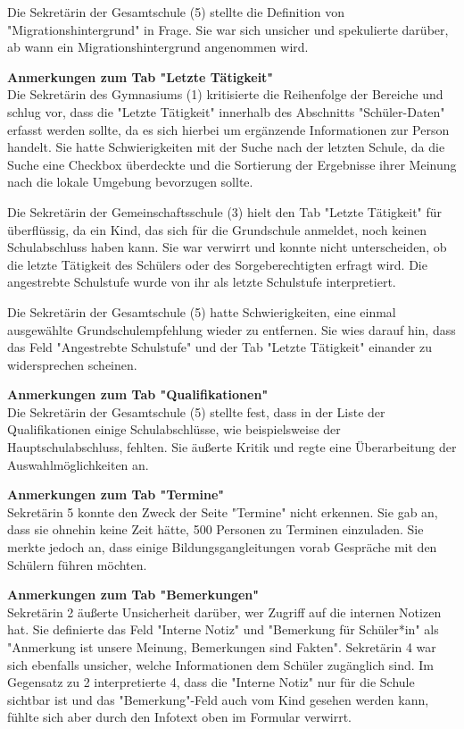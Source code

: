 Die Sekretärin der Gesamtschule (5) stellte die Definition von "Migrationshintergrund" in Frage. Sie war sich unsicher und spekulierte darüber, ab wann ein Migrationshintergrund angenommen wird.

\textbf{Anmerkungen zum Tab "Letzte Tätigkeit"}\\
Die Sekretärin des Gymnasiums (1) kritisierte die Reihenfolge der Bereiche und schlug vor, dass die "Letzte Tätigkeit" innerhalb des Abschnitts "Schüler-Daten" erfasst werden sollte, da es sich hierbei um ergänzende Informationen zur Person handelt. Sie hatte Schwierigkeiten mit der Suche nach der letzten Schule, da die Suche eine Checkbox überdeckte und die Sortierung der Ergebnisse ihrer Meinung nach die lokale Umgebung bevorzugen sollte.

Die Sekretärin der Gemeinschaftsschule (3) hielt den Tab "Letzte Tätigkeit" für überflüssig, da ein Kind, das sich für die Grundschule anmeldet, noch keinen Schulabschluss haben kann. Sie war verwirrt und konnte nicht unterscheiden, ob die letzte Tätigkeit des Schülers oder des Sorgeberechtigten erfragt wird. Die angestrebte Schulstufe wurde von ihr als letzte Schulstufe interpretiert.

Die Sekretärin der Gesamtschule (5) hatte Schwierigkeiten, eine einmal ausgewählte Grundschulempfehlung wieder zu entfernen. Sie wies darauf hin, dass das Feld "Angestrebte Schulstufe" und der Tab "Letzte Tätigkeit" einander zu widersprechen scheinen.

\textbf{Anmerkungen zum Tab "Qualifikationen"}\\
Die Sekretärin der Gesamtschule (5) stellte fest, dass in der Liste der Qualifikationen einige Schulabschlüsse, wie beispielsweise der Hauptschulabschluss, fehlten. Sie äußerte Kritik und regte eine Überarbeitung der Auswahlmöglichkeiten an.

\textbf{Anmerkungen zum Tab "Termine"}\\
Sekretärin 5 konnte den Zweck der Seite "Termine" nicht erkennen. Sie gab an, dass sie ohnehin keine Zeit hätte, 500 Personen zu Terminen einzuladen. Sie merkte jedoch an, dass einige Bildungsgangleitungen vorab Gespräche mit den Schülern führen möchten.

\textbf{Anmerkungen zum Tab "Bemerkungen"}\\
Sekretärin 2 äußerte Unsicherheit darüber, wer Zugriff auf die internen Notizen hat. Sie definierte das Feld "Interne Notiz" und "Bemerkung für Schüler*in" als "Anmerkung ist unsere Meinung, Bemerkungen sind Fakten". Sekretärin 4 war sich ebenfalls unsicher, welche Informationen dem Schüler zugänglich sind. Im Gegensatz zu 2 interpretierte 4, dass die "Interne Notiz" nur für die Schule sichtbar ist und das "Bemerkung"-Feld auch vom Kind gesehen werden kann, fühlte sich aber durch den Infotext oben im Formular verwirrt.


